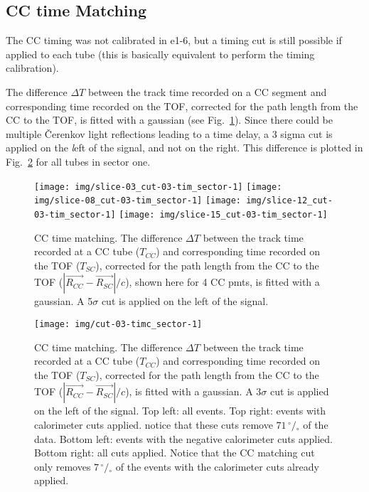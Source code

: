 \clearpage\newpage

\subsection{CC time Matching}\label{subsec:cc-time-matching}
The CC timing was not calibrated in e1-6, but a timing cut is still possible if applied to each tube
(this is basically equivalent to perform the timing calibration).

The difference $\Delta T$ between the track time recorded on a CC segment and corresponding time recorded on the TOF,
corrected for the path length from the CC to the TOF, is fitted with a gaussian (see Fig.~\ref{fig:cc_time_slices}).
Since there could be multiple \v Cerenkov light reflections leading to a time delay,
a 3 sigma cut is applied on the {\textit left} of the signal, and not on the right.
This difference is plotted in Fig.~\ref{fig:cc_time_sec1} for all tubes in sector one.

\begin{figure}[ht]
    \centering
    \texttt{[image: img/slice-03\_cut-03-tim\_sector-1]}
    \texttt{[image: img/slice-08\_cut-03-tim\_sector-1]}
    \texttt{[image: img/slice-12\_cut-03-tim\_sector-1]}
    \texttt{[image: img/slice-15\_cut-03-tim\_sector-1]}
    \caption{CC time matching. The difference $\Delta T$ between the track time recorded
    at a CC tube ($T_{CC}$) and corresponding time recorded on the TOF ($T_{SC}$),
        corrected for the path length from the CC to the TOF ($|\vec{R_{CC}}-\vec{R_{SC}}|/c$),
        shown here for 4 CC pmts, is fitted with a gaussian.
        A 5$\sigma$ cut is applied on the left of the signal.}
    \label{fig:cc_time_slices}
\end{figure}

\begin{figure}[ht]
    \centering
    \texttt{[image: img/cut-03-timc\_sector-1]}
    \caption{CC time matching. The difference $\Delta T$ between the track time recorded
    at a CC tube ($T_{CC}$) and corresponding time recorded on the TOF ($T_{SC}$),
        corrected for the path length from the CC to the TOF ($|\vec{R_{CC}}-\vec{R_{SC}}|/c$),
        is fitted with a gaussian. A 3$\sigma$ cut is applied on the left of the signal.
        Top left: all events. Top right: events with calorimeter cuts applied.
        notice that these cuts remove $71 \,^{\circ\!\!}/\!_\circ$ of the data.
        Bottom left: events with the negative calorimeter cuts applied.
        Bottom right: all cuts applied. Notice that the CC matching cut
        only removes $7  \,^{\circ\!\!}/\!_\circ$ of the events with
        the calorimeter cuts already applied.}
    \label{fig:cc_time_sec1}
\end{figure}

